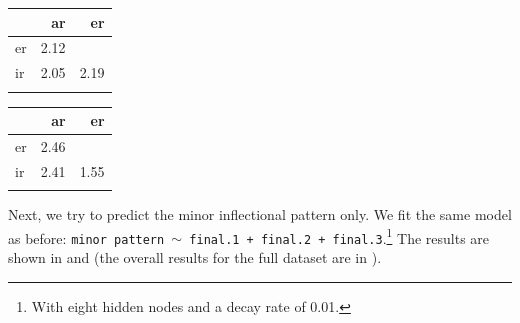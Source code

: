 \vspace{0.5cm}

\begin{minipage}{0.49\textwidth}
    \captionsetup{width=.8\linewidth}
    \centering
    \label{tab:spanish-verbs-theme-dist-prob}
    \begin{tabular}{lrr}
      \lsptoprule
      & ar   & er   \\
      \midrule
      er & 2.12 &      \\
      ir & 2.05 & 2.19 \\
      \lspbottomrule
    \end{tabular}
\end{minipage}%
\begin{minipage}{0.49\textwidth}
    \captionsetup{width=.8\linewidth}
    \label{tab:spanish-verbs-theme-dist-prob-2}
    \centering
    \begin{tabular}{lrr}
      \lsptoprule
      & ar   & er   \\
      \midrule
      er & 2.46 &      \\
      ir & 2.41 & 1.55 \\
      \lspbottomrule
    \end{tabular}
\end{minipage}

\vspace{0.5cm}

Next, we try to predict the minor inflectional pattern only. We fit the same model as before: \texttt{minor pattern $\sim$ final.1 + final.2 + final.3}.\footnote{With eight hidden nodes and a decay rate of 0.01.} The results are shown in  and  (the overall results for the full dataset are in ).

